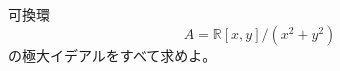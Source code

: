 \documentclass[12pt]{jlreq}
\newcommand{\R}{\mathbb{R}}
\begin{document}
可換環
\[
  A=\R[x,y]/(x^2+y^2)
\]
の極大イデアルをすべて求めよ。
\end{document}
